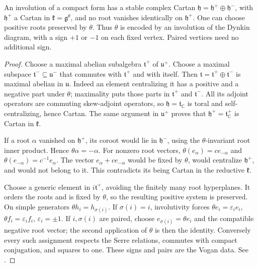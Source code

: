 \begin{proposition}\label{res:J05}
An involution of a compact form has a stable complex Cartan
\(\mathfrak h=\mathfrak h^+\oplus\mathfrak h^-\), with
\(\mathfrak h^+\) a Cartan in \(\mathfrak k=\mathfrak g^\theta\),
and no root vanishes identically on \(\mathfrak h^+\).
One can choose positive roots preserved by \(\theta\).
Thus \(\theta\) is encoded by an involution of the Dynkin
diagram, with a sign \(+1\) or \(-1\) on each fixed vertex.
Paired vertices need no additional sign.
\end{proposition}
\begin{proof}
Choose a maximal abelian subalgebra \(\mathfrak t^+\) of
\(\mathfrak u^+\). Choose a maximal subspace
\(\mathfrak t^-\subseteq\mathfrak u^-\) that commutes with
\(\mathfrak t^+\) and with itself. Then
\(\mathfrak t=\mathfrak t^+\oplus\mathfrak t^-\) is maximal
abelian in \(\mathfrak u\). Indeed an element centralizing it
has a positive and a negative part under \(\theta\); maximality
puts those parts in \(\mathfrak t^+\) and \(\mathfrak t^-\).
All its adjoint operators are commuting skew-adjoint operators,
so \(\mathfrak h=\mathfrak t_{\mathbb C}\) is toral and
self-centralizing, hence Cartan. The same argument in
\(\mathfrak u^+\) proves that
\(\mathfrak h^+=\mathfrak t^+_{\mathbb C}\) is Cartan in
\(\mathfrak k\).

If a root \(\alpha\) vanished on \(\mathfrak h^+\), its
coroot would lie in \(\mathfrak h^-\), using the
\(\theta\)-invariant root inner product. Hence
\(\theta\alpha=-\alpha\). For nonzero root vectors,
\(\theta(e_\alpha)=c e_{-\alpha}\) and
\(\theta(e_{-\alpha})=c^{-1}e_\alpha\).
The vector \(e_\alpha+c e_{-\alpha}\) would be fixed by
\(\theta\), would centralize \(\mathfrak h^+\), and would
not belong to it. This contradicts its being Cartan in
the reductive \(\mathfrak k\).

Choose a generic element in \(i\mathfrak t^+\), avoiding
the finitely many root hyperplanes. It orders the roots and
is fixed by \(\theta\), so the resulting positive system is
preserved. On simple generators
\(\theta h_i=h_{\sigma(i)}\).
If \(\sigma(i)=i\), involutivity forces
\(\theta e_i=\varepsilon_i e_i\),
\(\theta f_i=\varepsilon_i f_i\), \(\varepsilon_i=\pm1\).
If \(i,\sigma(i)\) are paired, choose \(e_{\sigma(i)}=\theta e_i\)
and the compatible negative root vector; the second application
of \(\theta\) is then the identity. Conversely every such
assignment respects the Serre relations, commutes with compact
conjugation, and squares to one.
These signs and pairs are the Vogan data.
See \cite[Proposition 41.7 and Lemma 41.8]{etingof}.
\end{proof}

